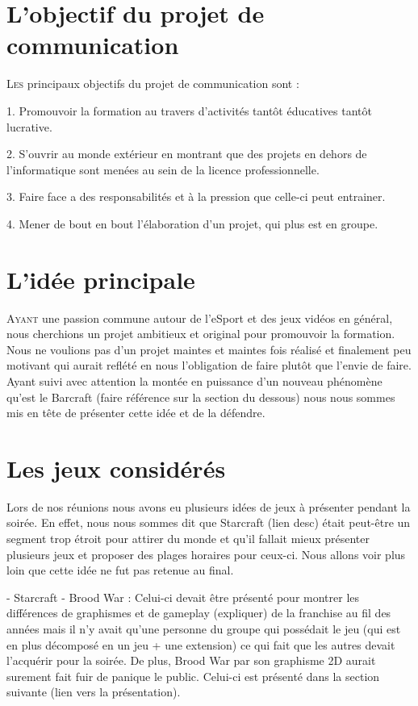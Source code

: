 \section{L'objectif du projet de communication}%
\label{sec:l_objectif_du_projet_de_communication}

\lettrine{L}{es} principaux objectifs du projet de communication sont :

1. Promouvoir la formation au travers d'activités tantôt éducatives
tantôt lucrative.

2. S'ouvrir au monde extérieur en montrant que des projets en dehors de
l'informatique sont menées au sein de la licence professionnelle.

3. Faire face a des responsabilités et à la pression que celle-ci peut
entrainer.

4. Mener de bout en bout l'élaboration d'un projet, qui plus est en
groupe.

\section{L'idée principale}
\label{sec:l_idee_principale}

\lettrine{A}{yant} une passion commune autour de l'eSport et des jeux
vidéos en général, nous cherchions un projet ambitieux et original
pour promouvoir la formation. Nous ne voulions pas d'un projet maintes
et maintes fois réalisé et finalement peu motivant qui aurait
reflété en nous l'obligation de faire plutôt que l'envie de faire.
Ayant suivi avec attention la montée en puissance d'un nouveau
phénomène qu'est le Barcraft (faire référence sur la section du
dessous) nous nous sommes mis en tête de présenter cette idée et de la
défendre.

\section{Les jeux considérés}%
\label{sec:les_jeux_consideres}

Lors de nos réunions nous avons eu plusieurs idées de jeux à présenter
pendant la soirée. En effet, nous nous sommes dit que Starcraft (lien
desc) était peut-être un segment trop étroit pour attirer du monde et
qu'il fallait mieux présenter plusieurs jeux et proposer des plages
horaires pour ceux-ci. Nous allons voir plus loin que cette idée ne fut
pas retenue au final.

- Starcraft - Brood War : Celui-ci devait être présenté pour montrer les
différences de graphismes et de gameplay (expliquer) de la franchise au
fil des années mais il n'y avait qu'une personne du groupe qui possédait
le jeu (qui est en plus décomposé en un jeu + une extension) ce qui fait
que les autres devait l'acquérir pour la soirée.  De plus, Brood War par
son graphisme 2D aurait surement fait fuir de panique le public.
Celui-ci est présenté dans la section suivante (lien vers la
présentation).

